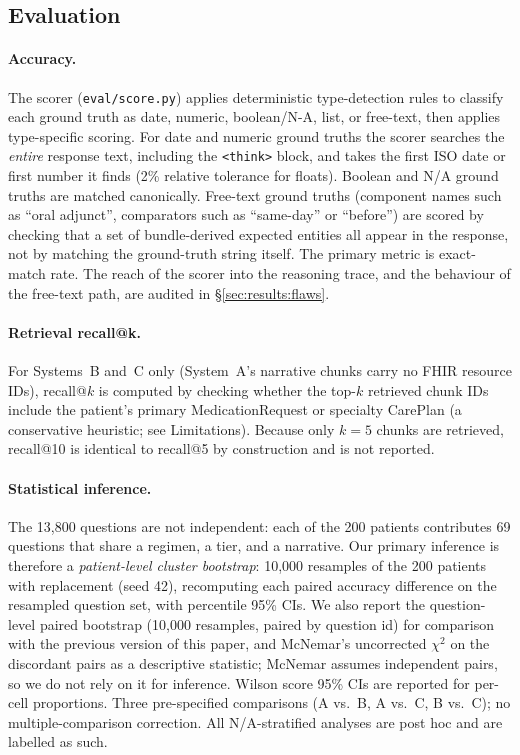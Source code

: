 \subsection{Evaluation}
\label{sec:methods:eval}

\paragraph{Accuracy.}
The scorer (\texttt{eval/score.py}) applies deterministic type-detection rules to classify
each ground truth as date, numeric, boolean/N-A, list, or free-text, then applies
type-specific scoring.  For date and numeric ground truths the scorer searches the
\emph{entire} response text, including the \texttt{<think>} block, and takes the first
ISO date or first number it finds (2\% relative tolerance for floats).  Boolean and N/A
ground truths are matched canonically.  Free-text ground truths (component names such as
``oral adjunct'', comparators such as ``same-day'' or ``before'') are scored by checking
that a set of bundle-derived expected entities all appear in the response, not by matching
the ground-truth string itself.  The primary metric is exact-match rate.  The reach of the
scorer into the reasoning trace, and the behaviour of the free-text path, are audited in
\S\ref{sec:results:flaws}.

\paragraph{Retrieval recall@k.}
For Systems~B and~C only (System~A's narrative chunks carry no FHIR resource IDs), recall@$k$
is computed by checking whether the top-$k$ retrieved chunk IDs include the patient's primary
MedicationRequest or specialty CarePlan (a conservative heuristic; see Limitations).  Because
only $k=5$ chunks are retrieved, recall@10 is identical to recall@5 by construction and is
not reported.

\paragraph{Statistical inference.}
The 13,800 questions are not independent: each of the 200 patients contributes 69
questions that share a regimen, a tier, and a narrative.  Our primary inference is
therefore a \emph{patient-level cluster bootstrap}: 10,000 resamples of the 200 patients
with replacement (seed 42), recomputing each paired accuracy difference on the resampled
question set, with percentile 95\% CIs.  We also report the question-level paired
bootstrap (10,000 resamples, paired by question id) for comparison with the previous
version of this paper, and McNemar's uncorrected $\chi^2$ on the discordant pairs as a
descriptive statistic; McNemar assumes independent pairs, so we do not rely on it for
inference.  Wilson score 95\% CIs are reported for per-cell proportions.  Three
pre-specified comparisons (A vs.\ B, A vs.\ C, B vs.\ C); no multiple-comparison
correction.  All N/A-stratified analyses are post hoc and are labelled as such.

